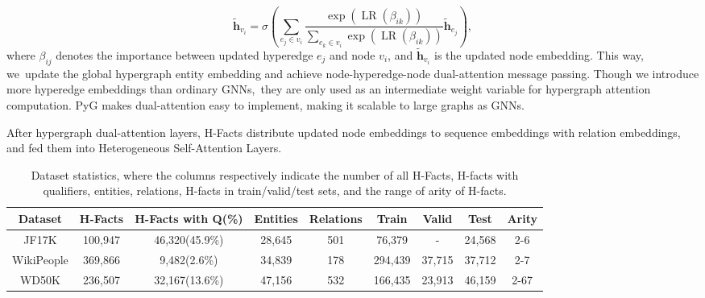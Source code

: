 \documentclass[11pt]{article}
\begin{document}
\begin{equation}
\tilde{\boldsymbol{h}}_{v_i}=\sigma\left(\sum_{e_j \in v_i} \frac{\exp\left(\operatorname{LR}\left(\beta_{i k}\right)\right)}{\sum_{e_k \in {v}_{i}} \exp \left(\operatorname{LR}\left(\beta_{i k}\right)\right)} \tilde{\boldsymbol{h}}_{e_j}\right),
\end{equation}
where $\beta_{i j}$ denotes the importance between updated hyperedge $e_j$ and node $v_i$, and $\tilde{\boldsymbol{h}}_{v_i}$ is the updated node embedding. This way, we update the global hypergraph entity embedding and achieve node-hyperedge-node dual-attention message passing. Though we introduce more hyperedge embeddings than ordinary GNNs, they are only used as an intermediate weight variable for hypergraph attention computation. PyG makes dual-attention easy to implement, making it scalable to large graphs as GNNs.

After hypergraph dual-attention layers, H-Facts distribute updated node embeddings to sequence embeddings with relation embeddings, and fed them into Heterogeneous Self-Attention Layers.



\begin{table*}
\small
  \centering
    \begin{tabular}{rrrrrrrrr}
    \toprule
    \multicolumn{1}{c}{Dataset} & \multicolumn{1}{c}{H-Facts} & \multicolumn{1}{c}{H-Facts with Q(\%)} & \multicolumn{1}{c}{Entities} & \multicolumn{1}{c}{Relations} & \multicolumn{1}{c}{Train} & \multicolumn{1}{c}{Valid} & \multicolumn{1}{c}{Test} &
    \multicolumn{1}{c}{Arity} \\
    \midrule
    \multicolumn{1}{c}{JF17K} & \multicolumn{1}{c}{100,947} & \multicolumn{1}{c}{46,320(45.9\%)} & \multicolumn{1}{c}{28,645} & \multicolumn{1}{c}{501} & \multicolumn{1}{c}{76,379} & \multicolumn{1}{c}{-} & \multicolumn{1}{c}{24,568} & 
    \multicolumn{1}{c}{2-6} \\
    \multicolumn{1}{c}{WikiPeople} & \multicolumn{1}{c}{369,866} & \multicolumn{1}{c}{9,482(2.6\%)} & \multicolumn{1}{c}{34,839} & \multicolumn{1}{c}{178} & \multicolumn{1}{c}{294,439} & \multicolumn{1}{c}{37,715} & \multicolumn{1}{c}{37,712} & 
    \multicolumn{1}{c}{2-7} \\
    \multicolumn{1}{c}{WD50K} & \multicolumn{1}{c}{236,507} & \multicolumn{1}{c}{32,167(13.6\%)} & \multicolumn{1}{c}{47,156} & \multicolumn{1}{c}{532} & \multicolumn{1}{c}{166,435} & \multicolumn{1}{c}{23,913} & \multicolumn{1}{c}{46,159} & 
    \multicolumn{1}{c}{2-67}\\
    \bottomrule
    \end{tabular}\caption{\label{T}
Dataset statistics, where the columns respectively indicate the number of all H-Facts, H-facts with qualifiers, entities, relations, H-facts in train/valid/test sets, and the range of arity of H-facts.}
\end{table*}
\end{document}
